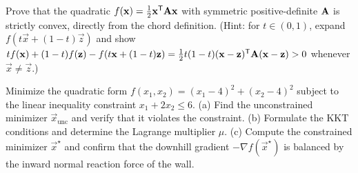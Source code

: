 \begin{exercise}
\label{ch36:exr-proof}
Prove that the quadratic $f(\mathbf{x})=\tfrac12\mathbf{x}^{\mathsf{T}}\mathbf{A}\mathbf{x}$ with symmetric
positive-definite $\mathbf{A}$ is strictly convex, directly from the chord definition.
(Hint: for $t\in(0,1)$, expand $f(t\vec{x}+(1-t)\vec{z})$ and show
$t f(\mathbf{x})+(1-t)f(\mathbf{z}) - f(t\mathbf{x}+(1-t)\mathbf{z}) = \tfrac12 t(1-t)(\mathbf{x}-
\mathbf{z})^{\mathsf{T}}\mathbf{A}(\mathbf{x}-\mathbf{z}) > 0$ whenever $\vec{x}\ne\vec{z}$.)
\end{exercise}

\begin{exercise}
\label{ch36:exr-kkt}
Minimize the quadratic form $f(x_1, x_2) = (x_1 - 4)^2 + (x_2 - 4)^2$ subject to the linear inequality constraint $x_1 + 2x_2 \le 6$.
(a) Find the unconstrained minimizer $\vec{x}_{\text{unc}}$ and verify that it violates the constraint.
(b) Formulate the KKT conditions and determine the Lagrange multiplier $\mu$.
(c) Compute the constrained minimizer $\vec{x}^\star$ and confirm that the downhill gradient $-\nabla f(\vec{x}^\star)$ is balanced by the inward normal reaction force of the wall.
\end{exercise}
